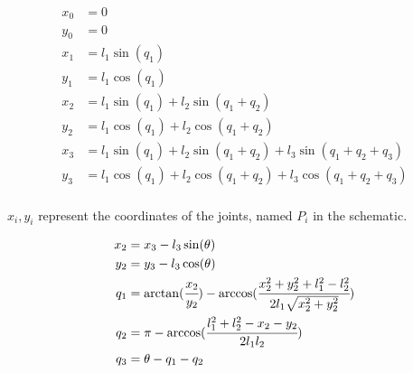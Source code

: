 \begin{equation}
\label{eq:forward_kinematics}
	\begin{align*}
		x_{0} &= 0 \\
		y_{0} &= 0 \\
		x_{1} &= l_{1} \sin(q_{1}) \\
		y_{1} &= l_{1} \cos(q_{1}) \\
		x_{2} &= l_{1} \sin(q_{1}) + l_{2} \sin(q_{1}+q_{2}) \\
		y_{2} &= l_{1} \cos(q_{1}) + l_{2} \cos(q_{1}+q_{2}) \\
		x_{3} &= l_{1} \sin(q_{1}) + l_{2} \sin(q_{1}+q_{2}) + l_{3} \sin(q_{1}+q_{2}+q_{3}) \\
		y_{3} &= l_{1} \cos(q_{1}) + l_{2} \cos(q_{1}+q_{2}) + l_{3} \cos(q_{1}+q_{2}+q_{3}) \\
	\end{align*}
\end{equation}

$x_{i}, y_{i}$ represent the coordinates of the joints, named $P_{i}$ in the schematic.


\begin{equation}
\label{eq:forward_kinematics}
	\begin{align*}
		x_{2} &= x_{3} - l_{3} \sin(\theta) \\
		y_{2} &= y_{3} - l_{3} \cos(\theta) \\
		q_{1} &= \arctan(\cfrac{x_{2}}{y_{2}}) - \arccos(\cfrac{x_{2}^2 + y_{2}^2 + l_{1}^2 - l_{2}^2}{2 l_{1} \sqrt{x_{2}^2 + y_{2}^2}}) \\
		q_{2} &= \pi - \arccos(\cfrac{l_{1}^2 + l_{2}^2 - x_{2} - y_{2}}{2 l_{1} l_{2}}) \\
		q_{3} &= \theta - q_{1} - q_{2} \\
	\end{align*}
\end{equation}